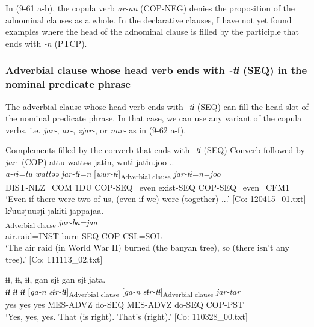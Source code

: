 In (9-61 a-b), the copula verb \textit{ar-an} (COP-NEG) denies the proposition of the adnominal clauses as a whole. In the declarative clauses, I have not yet found examples where the head of the adnominal clause is filled by the participle that ends with \textit{{}-n} (PTCP).

\subsubsection{Adverbial clause whose head verb ends with \textit{{}-tɨ} (SEQ) in the nominal predicate phrase}\label{sec:9.3.2.2}

The adverbial clause whose head verb ends with \textit{{}-tɨ} (SEQ) can fill the head slot of the nominal predicate phrase. In that case, we can use any variant of the copula verbs, i.e. \textit{jar-}, \textit{ar-}, \textit{zjar-}, or \textit{nar-} as in (9-62 a-f).

\ea   Complements filled by the converb that ends with \textit{{}-tɨ} (SEQ) \label{ex:9.62}
 \exi Converb followed by \textit{jar-} (COP)
\ea %
  \glll   attu  wattəə  jatɨn,  wutɨ   jatɨn.joo ..\\
      \textit{a-rɨ=tu}  \textit{wattəə}  \textit{jar-tɨ=n}  [\textit{wur-tɨ}]\textsubscript{Adverbial clause}    \textit{jar-tɨ=n=joo}\\
      DIST-NLZ=COM  1DU  COP-SEQ=even  exist-SEQ    COP-SEQ=even=CFM1\\
      \glt       ‘Even if there were two of us, (even if we) were (together) ...’ [Co: 120415\_01.txt]
\ex %
    \glll  {\textbar}kˀuusjuu{\textbar}sjɨ  jakɨtɨ  jappajaa.\\
      [\textit{kˀuusjuu=sjɨ}  \textit{jakɨr-tɨ}]\textsubscript{Adverbial clause}  \textit{jar-ba=jaa}\\
      air.raid=INST  burn-SEQ  COP-CSL=SOL\\
      \glt       ‘The air raid (in World War II) burned (the banyan tree), so (there isn’t any tree).’ [Co: 111113\_02.txt]

\ex %
      \glll ɨɨ,  ɨɨ,  ɨɨ,  gan  sjɨ  gan   sjɨ  jata.\\
      \textit{ɨɨ}  \textit{ɨɨ}  \textit{ɨɨ}  [\textit{ga-n}  \textit{sɨr-tɨ}]\textsubscript{Adverbial clause}  [\textit{ga-n}  \textit{sɨr-tɨ}]\textsubscript{Adverbial clause}  \textit{jar-tar}\\
      yes  yes  yes  MES-ADVZ  do-SEQ  MES-ADVZ       do-SEQ  COP-PST\\
      \glt   ‘Yes, yes, yes. That (is right). That’s (right).’   [Co: 110328\_00.txt]

